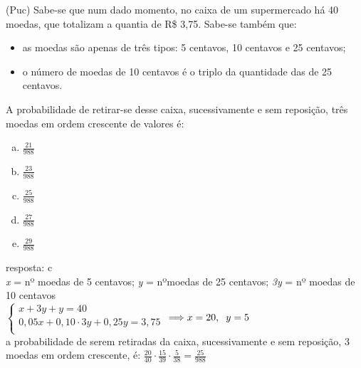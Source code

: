 \begin{ex}
  (Puc) Sabe-se que num dado momento, no caixa de um supermercado há 40 moedas, que totalizam a quantia de R\$ 3,75. Sabe-se também que: 
    \begin{itemize}  
        \item as moedas são apenas de três tipos: 5 centavos, 10 centavos e 25 centavos;
        \item o número de moedas de 10 centavos é o triplo da quantidade das de 25 centavos.
    \end{itemize}
   A probabilidade de retirar-se desse caixa, sucessivamente e sem reposição, três moedas em ordem crescente de valores é: 
    \begin{enumerate}  [(a)]
        \item $\frac{21}{988}$
        \item $\frac{23}{988}$
        \item $\frac{25}{988}$
        \item $\frac{27}{988}$
        \item $\frac{29}{988}$
    \end{enumerate}
      \begin{sol}
       resposta: c \\
       \textit{x} = nº moedas de 5 centavos;  \textit{y} = nºmoedas de 25 centavos; \textit{3y} = nº moedas de 10 centavos \\ 
       $
       \left \{
       \begin{array} {cl}
        x+3y+y=40 \\  
        0,05x+0,10\cdot3y+0,25y=3,75 \\
        \end{array}
        \right.
      $ $\Longrightarrow x=20,\hspace{0,2cm} y=5$ \\
      a probabilidade de serem retiradas da caixa, sucessivamente e sem reposição, 3 moedas em ordem crescente, é: $\frac{20}{40}\cdot\frac{15}{39}\cdot\frac{5}{38}=\frac{25}{988}$
      \end{sol}
 \end{ex}